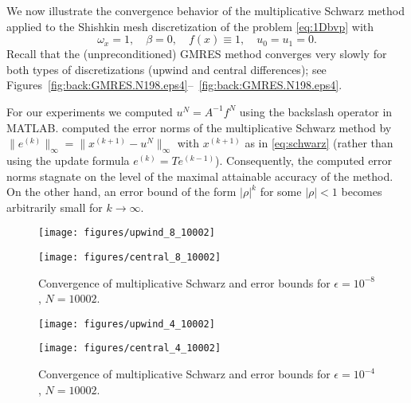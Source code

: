 We now illustrate the convergence behavior of the multiplicative
Schwarz method applied to the Shishkin mesh discretization of the problem
\eqref{eq:1Dbvp} with
%
$$\omega_x=1,\quad \beta=0,\quad f(x)\equiv 1,\quad u_0=u_1=0.$$
%
 Recall that the
(unpreconditioned) GMRES method converges very slowly for both types of
discretizations (upwind and central differences); see Figures~\ref{fig:back:GMRES.N198.eps4}--~\ref{fig:back:GMRES.N198.eps4}.

For our experiments we computed $u^N=A^{-1}f^N$ using the backslash operator
in MATLAB.
 computed the error norms of the multiplicative Schwarz method by
$\|e^{(k)}\|_\infty=\|x^{(k+1)}-u^N\|_\infty$ with $x^{(k+1)}$ as in
\eqref{eq:schwarz} (rather than using the update formula
$e^{(k)}=Te^{(k-1)}$). Consequently, the computed error norms
stagnate on the level of the maximal attainable accuracy of the method.
On the other hand, an error bound of the form $|\rho|^k$ for some
$|\rho|<1$ becomes arbitrarily small for $k\rightarrow\infty$.


\begin{figure}
\begin{minipage}[t]{0.49\linewidth}
\texttt{[image: figures/upwind\_8\_10002]}
\end{minipage}
%
\begin{minipage}[t]{0.49\linewidth}
\texttt{[image: figures/central\_8\_10002]}
\end{minipage}
\caption{Convergence of multiplicative Schwarz and error bounds for
$\epsilon=10^{-8}$, $N=10002$. }
\label{fig:1D:MSM.N10002.eps8}
\end{figure}

\begin{figure}
\begin{minipage}[t]{0.49\linewidth}
\texttt{[image: figures/upwind\_4\_10002]}
\end{minipage}
%
\begin{minipage}[t]{0.49\linewidth}
\texttt{[image: figures/central\_4\_10002]}
\end{minipage}
\caption{Convergence of multiplicative Schwarz and error bounds for
$\epsilon=10^{-4}$, $N=10002$. }
\label{fig:1D:MSM.N10002.eps4}
\end{figure}

